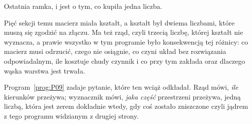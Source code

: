 \begin{fr}
Ostatnia ramka, i jest o tym, co kupiła jedna liczba.

Pięć sekcji temu macierz miała kształt, a kształt był dwiema liczbami, które
muszą się zgodzić na złączu. Ma też rząd, czyli trzecią liczbę, której kształt
nie wyznacza, a prawie wszystko w tym programie było konsekwencją tej różnicy:
co macierz musi odrzucić, czego nie osiągnie, co czyni układ bez rozwiązania
odpowiadalnym, ile kosztuje chudy czynnik i co przy tym zakłada oraz dlaczego
wąska warstwa jest trwała.

Program~\ref{prog:P09} zadaje pytanie, które ten wciąż odkładał. Rząd mówi,
\emph{ile} kierunków przeżywa; wyznacznik mówi, \emph{jaka część} przestrzeni
przeżywa, jedną liczbą, która jest zerem dokładnie wtedy, gdy coś zostało
zniszczone \dash{} czyli jądrem z tego programu widzianym z drugiej strony.
\end{fr}

